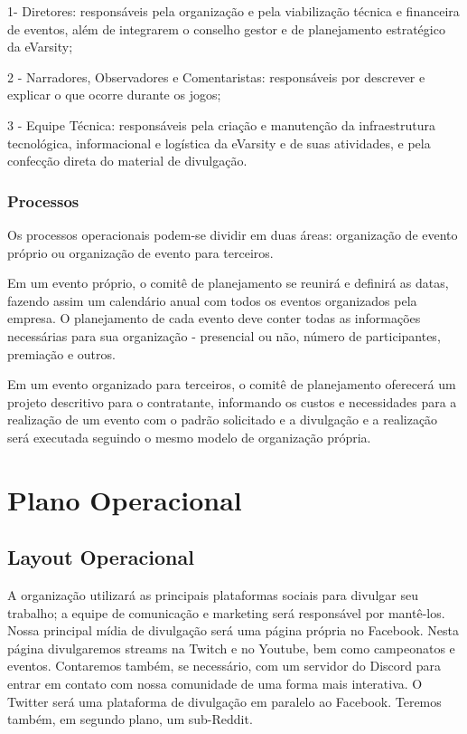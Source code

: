 \documentclass[a4paper, 12pt]{paper}
\begin{document}
1- Diretores: responsáveis pela organização e pela viabilização técnica e financeira de eventos, além de integrarem o conselho gestor e de planejamento estratégico da eVarsity;

2 - Narradores, Observadores e Comentaristas: responsáveis por descrever e explicar o que ocorre durante os jogos;

3 - Equipe Técnica: responsáveis pela criação e manutenção da infraestrutura tecnológica, informacional e logística da eVarsity e de suas atividades, e pela confecção direta do material de divulgação.
\subsubsection{Processos}
Os processos operacionais podem-se dividir em duas áreas: organização de evento próprio ou organização de evento para terceiros.

Em um evento próprio, o comitê de planejamento se reunirá e definirá as datas, fazendo assim um calendário anual com todos os eventos organizados pela empresa. O planejamento de cada evento deve conter todas as informações necessárias para sua organização - presencial ou não, número de participantes, premiação e outros.

Em um evento organizado para terceiros, o comitê de planejamento oferecerá um projeto descritivo para o contratante, informando os custos e necessidades para a realização de um evento com o padrão solicitado e a divulgação e a realização será executada seguindo o mesmo modelo de organização própria.
\newpage
\section{Plano Operacional}
\subsection{Layout Operacional}
\label{layoutop}
A organização utilizará as principais plataformas sociais para divulgar seu trabalho; a equipe de comunicação e marketing será responsável por mantê-los. Nossa principal mídia de divulgação será uma página própria no Facebook. Nesta página divulgaremos streams na Twitch e no Youtube, bem como campeonatos e eventos. Contaremos também, se necessário, com um servidor do Discord para entrar em contato com nossa comunidade de uma forma mais interativa. O Twitter será uma plataforma de divulgação em paralelo ao Facebook. Teremos também, em segundo plano, um sub-Reddit.
\end{document}
